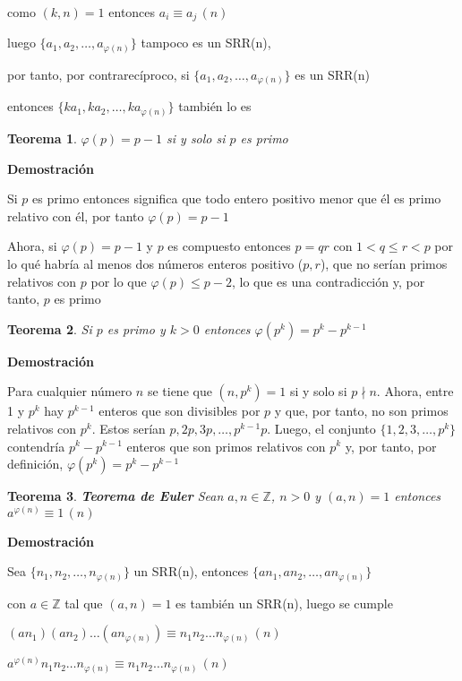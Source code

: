 \documentclass[a4paper,12pt]{report}
\newtheorem*{teo}{Teorema}
\begin{document}
como $(k,n)=1$ entonces $a_i\equiv a_j \, (n)$

luego $\{a_1,a_2,\dots,a_{\varphi(n)}\}$ tampoco es un SRR(n), 

por tanto, por contrarecíproco, si $\{a_1,a_2,\dots,a_{\varphi(n)}\}$ es un SRR(n) 

entonces $\{ka_1,ka_2,\dots,ka_{\varphi(n)}\}$ también lo es

\begin{teo}
 $\varphi(p)=p-1$ si y solo si $p$ es primo
\end{teo}

\textbf{Demostración}

Si $p$ es primo entonces significa que todo entero positivo menor que él es primo relativo con él, por tanto $\varphi(p)=p-1$

Ahora, si $\varphi(p)=p-1$ y $p$ es compuesto entonces $p=qr$ con $1<q \leq r <p$ por lo qué habría al menos dos números enteros positivo ($p,r$),  que no serían primos relativos con $p$ por lo que $\varphi(p)\leq p-2$, lo que es una contradicción y, por tanto, $p$ es primo

\begin{teo}
 Si $p$ es primo y $k>0$ entonces $\varphi(p^k)=p^k - p^{k-1}$ 
\end{teo}

\textbf{Demostración}

Para cualquier número $n$ se tiene que $(n,p^k)=1$ si y solo si $p\nmid n$. Ahora, entre 1 y $p^k$ hay $p^{k-1}$ enteros que son divisibles por $p$ y que, por tanto, no son primos relativos con $p^k$. Estos serían $p,2p,3p,\dots,p^{k-1}p$. Luego, el conjunto $\{1,2,3,\dots,p^k\}$ contendría $p^k-p^{k-1}$ enteros que son primos relativos con $p^k$ y, por tanto, por definición, $\varphi(p^k)=p^k - p^{k-1}$ 

\begin{teo}
 \textbf{Teorema de Euler} Sean $a,n\in\mathbb{Z}$, $n>0$ y $(a,n)=1$ entonces $a^{\varphi(n)}\equiv 1\, (n)$
\end{teo}

\textbf{Demostración}

Sea $\{n_1,n_2,\dots,n_{\varphi(n)}\}$ un SRR(n), entonces $\{an_1,an_2,\dots,an_{\varphi(n)}\}$ 

con $a\in\mathbb{Z}$ tal que $(a,n)=1$ es también un SRR(n), luego se cumple

$(an_1)(an_2)\dots(an_{\varphi(n)})\equiv n_1 n_2 \dots n_{\varphi(n)} \, (n)$

$a^{\varphi(n)}n_1 n_2\dots n_{\varphi(n)}\equiv n_1 n_2 \dots n_{\varphi(n)} \, (n)$
\end{document}
